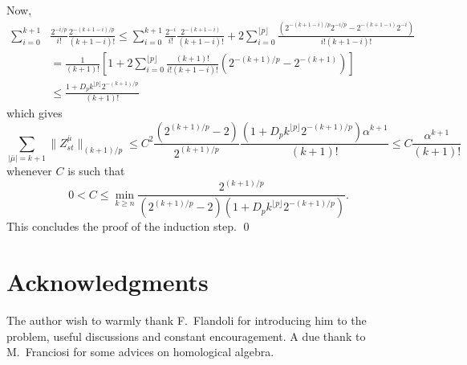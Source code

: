 \documentclass[a4paper,12pt,reqno]{amsproc}
\newcommand{\norm}[1]{\lVert #1\rVert}
\begin{document}
Now,
\begin{equation*}
  \begin{split}
\sum_{i=0}^{k+1} &
\frac{2^{-i/p}}{i!} \frac{2^{-(k+1-i)/p}}{(k+1-i)!} \le
    \sum_{i=0}^{k+1} 
\frac{2^{-i}}{i!} \frac{2^{-(k+1-i)}}{(k+1-i)!} +2 \sum_{i=0}^{\lfloor p \rfloor}
\frac{ (2^{-(k+1-i)/p} 2^{-i/p}-2^{-(k+1-i)} 2^{-i})}{i!(k+1-i)!}
\\ & = \frac{1}{(k+1)!}\left[1+2
\sum_{i=0}^{\lfloor p \rfloor}
\frac{(k+1)!}{i!(k+1-i)!} (2^{-(k+1)/p} -2^{-(k+1)})
\right]
\\ & \le \frac{1+D_p k^{\lfloor p \rfloor} 2^{-(k+1)/p}}{(k+1)!}
  \end{split}
\end{equation*}
which gives
\begin{equation*}
  \sum_{|\bar\mu| = k+1} \norm{Z^{\bar\mu}_{st}}_{(k+1)/p} \le
  C^2 \frac{(2^{(k+1)/p}-2)}{2^{(k+1)/p}}  
\frac{(1+D_p k^{\lfloor p \rfloor} 2^{-(k+1)/p})\alpha^{k+1}}{(k+1)!}
\le
C \frac{\alpha^{k+1}}{(k+1)!}
\end{equation*}
whenever $C$ is such that
\begin{equation}
\label{eq:smallness_of_C}
 0 < C \le  \min_{k \ge n} \frac{2^{(k+1)/p}}{(2^{(k+1)/p}-2)(1+D_p k^{\lfloor p \rfloor}
 2^{-(k+1)/p})}.
\end{equation}
This concludes the proof of the induction step.
\qed

\section*{Acknowledgments}
The author wish to warmly thank F.~Flandoli for introducing him
to the problem, useful discussions and  constant
encouragement. A due thank to M.~Franciosi for some advices on homological algebra. 
   
\end{document}
